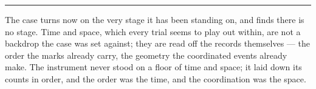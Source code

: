 %
%
%
%

\bigskip
\begin{center}
\rule{0.4\textwidth}{0.4pt}
\end{center}
\bigskip

\noindent The case turns now on the very stage it has been standing on, and finds there is no stage. Time and
space, which every trial seems to play out within, are not a backdrop the case was set against; they are read
off the records themselves --- the order the marks already carry, the geometry the coordinated events already
make. The instrument never stood on a floor of time and space; it laid down its counts in order, and the order
was the time, and the coordination was the space.

